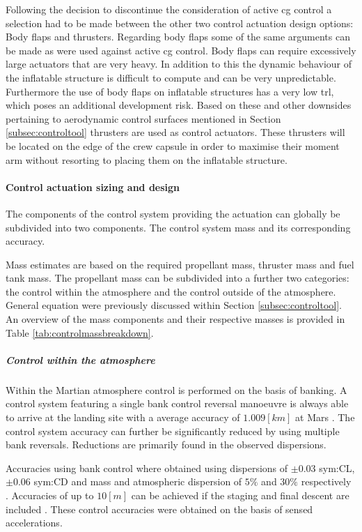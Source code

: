 Following the decision to discontinue the consideration of active \gls{cg} control a selection had to be made between the other two control actuation design options: Body flaps and thrusters. Regarding body flaps some of the same arguments can be made as were used against active \gls{cg} control. Body flaps can require excessively large actuators that are very heavy. In addition to this the dynamic behaviour of the inflatable structure is difficult to compute and can be very unpredictable. Furthermore the use of body flaps on inflatable structures has a very low \gls{trl}, which poses an additional development risk. Based on these and other downsides pertaining to aerodynamic control surfaces mentioned in Section \ref{subsec:controltool} thrusters are used as control actuators. These thrusters will be located on the edge of the crew capsule in order to maximise their moment arm without resorting to placing them on the inflatable structure.

\paragraph{Control actuation sizing and design}
The components of the control system providing the actuation can globally be subdivided into two components. The control system mass and its corresponding accuracy.

Mass estimates are based on the required propellant mass, thruster mass and fuel tank mass. The propellant mass can be subdivided into a further two categories: the control within the atmosphere and the control outside of the atmosphere. General equation were previously discussed within Section \ref{subsec:controltool}. An overview of the mass components and their respective masses is provided in Table \ref{tab:controlmassbreakdown}.

\subparagraph{Control within the atmosphere} 
Within the Martian atmosphere control is performed on the basis of banking. A control system featuring a single bank control reversal manoeuvre is always able to arrive at the landing site with a average accuracy of $1.009 \left[km\right]$ at Mars \cite{Lu2007}. The control system accuracy can further be significantly reduced by using multiple bank reversals. Reductions are primarily found in the observed dispersions.

Accuracies using bank control where obtained using dispersions of $\pm 0.03 $ \gls{sym:CL}, $\pm 0.06 $ \gls{sym:CD} and mass and atmospheric dispersion of $5\%$ and $30\%$ respectively \cite{Lu2007}. Accuracies of up to $10 \left[m\right]$ can be achieved if the staging and final descent are included \cite{Davis2010}. These control accuracies were obtained on the basis of sensed accelerations.

